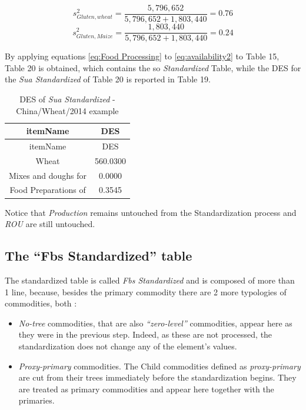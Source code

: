 \documentclass[]{article}
\providecommand{\tightlist}{%
  \setlength{\itemsep}{0pt}\setlength{\parskip}{0pt}}
\begin{document}
\begin{equation}
\label{eq:shareEx1}
s^{2}_{Gluten,wheat} = \frac{5,796,652}{5,796,652 + 1,803,440} = 0.76
\end{equation}\begin{equation}
\label{eq:shareEx1}
s^{2}_{Gluten,Maize} = \frac{1,803,440}{5,796,652 + 1,803,440} = 0.24
\end{equation}

By applying equations \ref{eq:Food Processing} to \ref{eq:availability2}
to Table 15, Table 20 is obtained, which contains the so
\emph{Standardized} Table, while the DES for the \emph{Sua Standardized}
of Table 20 is reported in Table 19.

\begin{longtable}[]{@{}cc@{}}
\caption{DES of \emph{Sua Standardized} - China/Wheat/2014
example}\tabularnewline
\toprule
itemName & DES\tabularnewline
\midrule
\endfirsthead
\toprule
itemName & DES\tabularnewline
\midrule
\endhead
Wheat & 560.0300\tabularnewline
Mixes and doughs for & 0.0000\tabularnewline
Food Preparations of & 0.3545\tabularnewline
\bottomrule
\end{longtable}

Notice that \emph{Production} remains untouched from the Standardization
process and \emph{ROU} are still untouched.

\subsection*{\texorpdfstring{The ``Fbs Standardized''
table}{The Fbs Standardized table}}\label{the-fbs-standardized-table}

The standardized table is called \emph{Fbs Standardized} and is composed
of more than 1 line, because, besides the primary commodity there are 2
more typologies of commodities, both :

\begin{itemize}
\tightlist
\item
  \emph{No-tree} commodities, that are also \emph{``zero-level''}
  commodities, appear here as they were in the previous step. Indeed, as
  these are not processed, the standardization does not change any of
  the element's values.
\item
  \emph{Proxy-primary} commodities. The Child commodities defined as
  \emph{proxy-primary} are cut from their trees immediately before the
  standardization begins. They are treated as primary commodities and
  appear here together with the primaries.
\end{itemize}
\end{document}
